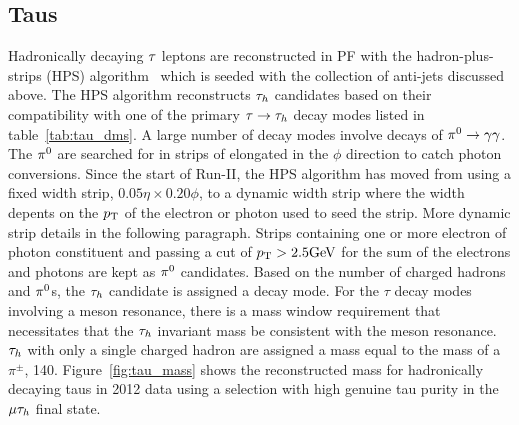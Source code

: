 \subsection{Taus}
Hadronically decaying $\tau$ leptons are reconstructed in PF with the hadron-plus-strips (HPS)
algorithm~\cite{Khachatryan:2015dfa, CMS-PAS-TAU-16-002} which is seeded with the collection of 
anti-\kt jets discussed above. The HPS algorithm reconstructs $\tau_{h}$ candidates based on their
compatibility with one of the primary $\tau\to\tau_{h}$ decay modes listed in table~\ref{tab:tau_dms}.
A large number of decay modes involve decays of $\pi^{0}  \to  \gamma\gamma$. The $\pi^{0}$ are
searched for in strips of \etaphi elongated in the $\phi$ direction to catch photon conversions.
Since the start of Run-II, the HPS algorithm has moved from using a fixed width strip,
$0.05 \eta \times 0.20 \phi$, to a dynamic width strip where the width depents on the 
$p_\mathrm{T}$ of the electron or photon used to seed the strip. More dynamic strip details in the following paragraph.
Strips containing one or more electron of photon constituent and passing a cut of $p_\mathrm{T} > 2.5\mathrm{GeV}$
for the sum of the electrons and photons are kept as $\pi^{0}$ candidates. Based on the number of
charged hadrons and $\pi^{0}$s, the $\tau_{h}$ candidate is assigned a decay mode. For the $\tau$
decay modes involving a meson resonance, there is a mass window requirement that necessitates
that the $\tau_{h}$ invariant mass be consistent with the meson resonance. $\tau_{h}$ with only a single
charged hadron are assigned a mass equal to the mass of a $\pi^{\pm}$, 140\MeV. Figure~\ref{fig:tau_mass}
shows the reconstructed mass for hadronically decaying taus in 2012 data using a selection with
high genuine tau purity in the $\mu\tau_{h}$ final state.

